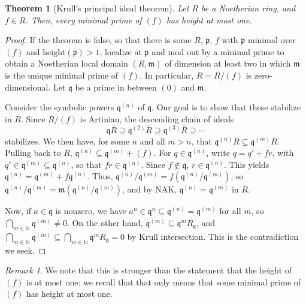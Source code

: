\documentclass{amsart}[12pt]
\def\htt{\mathrm{height}}
\newcommand{\NN}{\mathbb{N}}
\newcommand{\p}{{\mathfrak p}}
\newcommand{\m}{{\mathfrak m}}
\newcommand{\q}{{\mathfrak q}}
\numberwithin{equation}{section}
\theoremstyle{plain} %
\newtheorem{theorem}[equation]{Theorem}
\theoremstyle{definition}
\theoremstyle{remark}
\newtheorem{rem}[equation]{Remark}
\begin{document}
\begin{theorem}[Krull's principal ideal theorem]
	Let $R$ be a Noetherian ring, and $f\in R$. Then, every minimal prime of $(f)$ has height at most one.
\end{theorem}
\begin{proof}
	If the theorem is false, so that there is some $R$, $\p$, $f$ with $\p$ minimal over $(f)$ and $\htt(\p)>1$, localize at $\p$ and mod out by a minimal prime to obtain a Noetherian local domain $(R,\m)$ of dimension at least two in which $\m$ is the unique minimal prime of $(f)$. In particular, $\overline{R}=R/(f)$ is zero-dimensional. Let $\q$ be a prime in between $(0)$ and $\m$.
	
	Consider the symbolic powers $\q^{(n)}$ of $\q$. Our goal is to show that these stabilize in $R$. Since $R/(f)$ is Artinian, the descending chain of ideals 
	\[ \q\overline{R} \supseteq \q^{(2)}\overline{R} \supseteq \q^{(3)}\overline{R} \supseteq \cdots\]
	stabilizes. We then have, for some $n$ and all $m>n$, that $\q^{(n)} \overline{R} \subseteq \q^{(m)} \overline{R}$. Pulling back to $R$, $\q^{(n)} \subseteq \q^{(m)} + (f)$. For $q\in \q^{(n)}$, write $q=q'+fr$, with $q'\in \q^{(m)}\subseteq \q^{(n)}$, so that $fr\in \q^{(n)}$. Since $f\notin \q$, $r\in \q^{(n)}$. This yields $\q^{(n)} = \q^{(m)} + f \q^{(n)}$. Thus, $\q^{(n)} / \q^{(m)} = f(\q^{(n)} / \q^{(m)})$, so $\q^{(n)} / \q^{(m)} = \m(\q^{(n)} / \q^{(m)})$, and by NAK, $\q^{(n)} = \q^{(m)}$ in $R$.
	
	Now, if $a\in \q$ is nonzero, we have $a^n\in \q^n \subseteq \q^{(n)} =\q^{(m)}$ for all $m$, so $\bigcap_{m\in \NN} \q^{(m)}\neq 0$. On the other hand, $\q^{(m)} \subseteq \q^m R_{\q}$, and $\bigcap_{m\in \NN} \q^{(m)} \subseteq \bigcap_{m\in \NN} \q^m R_{\q} =0$ by Krull intersection. This is the contradiction we seek.
\end{proof}

\begin{rem} We note that this is stronger than the statement that the height of $(f)$ is at most one: we recall that that only means that some minimal prime of $(f)$ has height at most one.
\end{rem}
\end{document}

